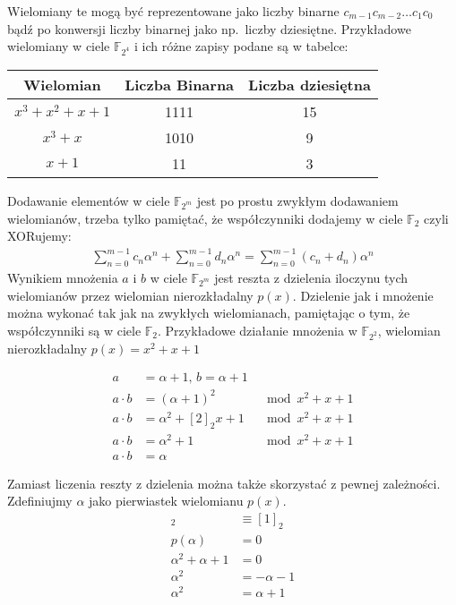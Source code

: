 Wielomiany te mogą być reprezentowane jako liczby binarne $c_{m-1} c_{m-2} \ldots c_{1} c_{0}$ bądź po konwersji liczby binarnej jako np.\ liczby dziesiętne. Przykładowe wielomiany w ciele $\mathbb{F}_{2^4}$ i ich różne zapisy podane są w tabelce:
\begin{table}[hp]
    \centering
    \begin{tabular}{c c c}
        \toprule
        Wielomian & Liczba Binarna & Liczba dziesiętna \\
        \midrule
        $x^3 + x^2 + x + 1$ & 1111 & 15 \\
        \midrule
        $x^3 + x$ & 1010 & 9 \\
        \midrule
        $x + 1$ & 11 & 3 \\
        \bottomrule
    \end{tabular}
\end{table}

Dodawanie elementów w ciele $\mathbb{F}_{2^m}$ jest po prostu zwykłym dodawaniem wielomianów, trzeba tylko pamiętać, że współczynniki dodajemy w ciele $\mathbb{F}_2$ czyli XORujemy:
\begin{align*}
    \sum_{n=0}^{m-1} c_n \alpha^n + \sum_{n=0}^{m-1} d_n \alpha^n =
    \sum_{n=0}^{m-1} (c_n + d_n) \alpha^n
\end{align*}
Wynikiem mnożenia $a$ i $b$ w ciele $\mathbb{F}_{2^m}$ jest reszta z
dzielenia iloczynu tych wielomianów przez wielomian nierozkładalny $p(x)$.
Dzielenie jak i mnożenie można wykonać tak jak na zwykłych wielomianach, pamiętając o tym, że współczynniki są w ciele $\mathbb{F}_2$.
\newline
Przykładowe działanie mnożenia w $\mathbb{F}_{2^2}$, wielomian nierozkładalny $p(x)=x^2 + x + 1$

\begin{align*}
    a &= \alpha + 1 \text{, } b = \alpha + 1 \\
    a \cdot b &= (\alpha + 1)^2 &\mod x^2 + x + 1 \\
    a \cdot b &= \alpha^2 + [2]_{2}x + 1 &\mod x^2 + x + 1 \\
    a \cdot b &= \alpha^2 + 1 &\mod x^2 + x + 1 \\
    a \cdot b &= \alpha
\end{align*}

Zamiast liczenia reszty z dzielenia można także skorzystać z pewnej zależności. Zdefiniujmy $\alpha$ jako pierwiastek wielomianu $p(x)$.
\begin{align*}
    [-1]_2 &\equiv [1]_2 \\
    p(\alpha) &= 0 \\
    \alpha^2 + \alpha + 1 &= 0 \\
    \alpha^2 &= -\alpha - 1 \\
    \alpha^2 &= \alpha + 1
\end{align*}

